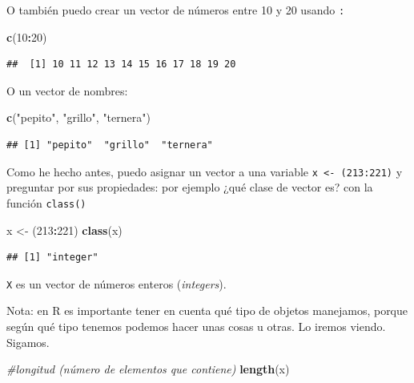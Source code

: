 \documentclass[]{book}
\newenvironment{Shaded}{\begin{snugshade}}{\end{snugshade}}
\newcommand{\CommentTok}[1]{\textcolor[rgb]{0.56,0.35,0.01}{\textit{#1}}}
\newcommand{\DecValTok}[1]{\textcolor[rgb]{0.00,0.00,0.81}{#1}}
\newcommand{\KeywordTok}[1]{\textcolor[rgb]{0.13,0.29,0.53}{\textbf{#1}}}
\newcommand{\NormalTok}[1]{#1}
\newcommand{\OperatorTok}[1]{\textcolor[rgb]{0.81,0.36,0.00}{\textbf{#1}}}
\newcommand{\StringTok}[1]{\textcolor[rgb]{0.31,0.60,0.02}{#1}}
\theoremstyle{definition}
\theoremstyle{definition}
\theoremstyle{definition}
\theoremstyle{remark}
\begin{document}
O también puedo crear un vector de números entre 10 y 20 usando
\texttt{:}

\begin{Shaded}
\begin{Highlighting}[]
\KeywordTok{c}\NormalTok{(}\DecValTok{10}\OperatorTok{:}\DecValTok{20}\NormalTok{)}
\end{Highlighting}
\end{Shaded}

\begin{verbatim}
##  [1] 10 11 12 13 14 15 16 17 18 19 20
\end{verbatim}

O un vector de nombres:

\begin{Shaded}
\begin{Highlighting}[]
\KeywordTok{c}\NormalTok{(}\StringTok{"pepito"}\NormalTok{, }\StringTok{"grillo"}\NormalTok{, }\StringTok{"ternera"}\NormalTok{)}
\end{Highlighting}
\end{Shaded}

\begin{verbatim}
## [1] "pepito"  "grillo"  "ternera"
\end{verbatim}

Como he hecho antes, puedo asignar un vector a una variable
\texttt{x\ \textless{}-\ (213:221)} y preguntar por sus propiedades: por
ejemplo ¿qué clase de vector es? con la función \texttt{class()}

\begin{Shaded}
\begin{Highlighting}[]
\NormalTok{x <-}\StringTok{ }\NormalTok{(}\DecValTok{213}\OperatorTok{:}\DecValTok{221}\NormalTok{)}
\KeywordTok{class}\NormalTok{(x)}
\end{Highlighting}
\end{Shaded}

\begin{verbatim}
## [1] "integer"
\end{verbatim}

\texttt{X} es un vector de números enteros (\emph{integers}).

Nota: en R es importante tener en cuenta qué tipo de objetos manejamos,
porque según qué tipo tenemos podemos hacer unas cosas u otras. Lo
iremos viendo. Sigamos.

\begin{Shaded}
\begin{Highlighting}[]
\CommentTok{#longitud (número de elementos que contiene)}
\KeywordTok{length}\NormalTok{(x)}
\end{Highlighting}
\end{Shaded}
\end{document}
